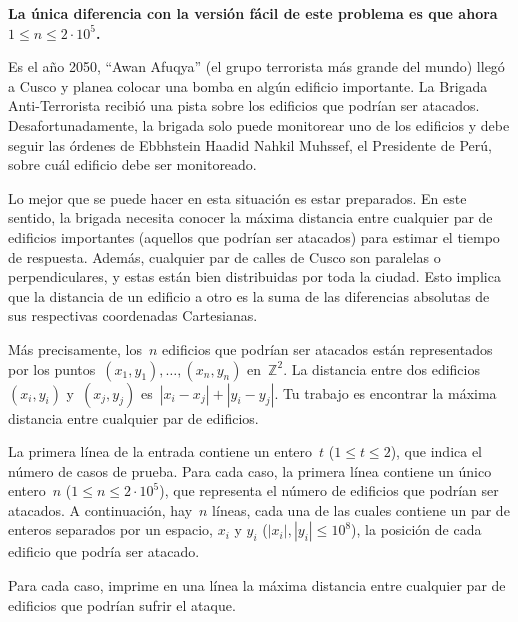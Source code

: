 
\textbf{La única diferencia con la versión fácil de este problema es que ahora~$1 \leq n \leq 2 \cdot 10^5$.}

Es el año 2050, ``Awan Afuqya'' (el grupo terrorista más grande del mundo) llegó a
Cusco y planea colocar una bomba en algún edificio importante. La Brigada
Anti-Terrorista recibió una pista sobre los edificios que podrían ser
atacados. Desafortunadamente, la brigada solo puede monitorear uno de los edificios y
debe seguir las órdenes de Ebbhstein Haadid Nahkil Muhssef, el Presidente de Perú,
sobre cuál edificio debe ser monitoreado.

Lo mejor que se puede hacer en esta situación es estar preparados. En este sentido,
la brigada necesita conocer la máxima distancia entre cualquier par de edificios
importantes (aquellos que podrían ser atacados) para estimar el tiempo de
respuesta. Además, cualquier par de calles de Cusco son paralelas o perpendiculares,
y estas están bien distribuidas por toda la ciudad. Esto implica que la distancia de
un edificio a otro es la suma de las diferencias absolutas de sus respectivas
coordenadas Cartesianas.

Más precisamente, los~$n$ edificios que podrían ser atacados están representados por
los puntos~$(x_1, y_1), \dots, (x_n, y_n)$ en~$\mathbb{Z}^2$. La distancia entre dos
edificios~$(x_i, y_i)$ y~$(x_j, y_j)$ es~$|x_i - x_j| + |y_i - y_j|$. Tu trabajo es
encontrar la máxima distancia entre cualquier par de edificios.


La primera línea de la entrada contiene un entero~$t$ ($1 \leq t \leq 2$), que indica
el número de casos de prueba. Para cada caso, la primera línea contiene un único
entero~$n$ ($1 \leq n \leq 2 \cdot 10^5$), que representa el número de edificios que
podrían ser atacados. A continuación, hay~$n$ líneas, cada una de las cuales contiene
un par de enteros separados por un espacio, $x_i$ y $y_i$ ($|x_i|, |y_i| \leq 10^8$),
la posición de cada edificio que podría ser atacado.

\outputText

Para cada caso, imprime en una línea la máxima distancia entre cualquier par de
edificios que podrían sufrir el ataque.

